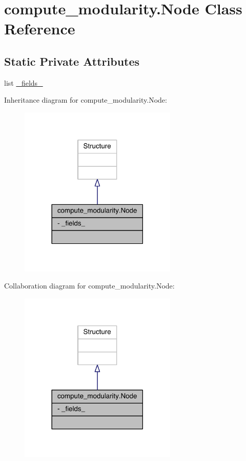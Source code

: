 \hypertarget{classcompute__modularity_1_1_node}{\section{compute\+\_\+modularity.\+Node Class Reference}
\label{classcompute__modularity_1_1_node}
}
\subsection*{Static Private Attributes}
\begin{DoxyCompactItemize}
\item 
list \hyperlink{classcompute__modularity_1_1_node_aab150ff895b8721c991a02712602effb}{\+\_\+fields\+\_\+}
\end{DoxyCompactItemize}


Inheritance diagram for compute\+\_\+modularity.\+Node\+:\nopagebreak
\begin{figure}[H]
\begin{center}
\leavevmode
\includegraphics[width=213pt]{classcompute__modularity_1_1_node__inherit__graph}
\end{center}
\end{figure}


Collaboration diagram for compute\+\_\+modularity.\+Node\+:\nopagebreak
\begin{figure}[H]
\begin{center}
\leavevmode
\includegraphics[width=213pt]{classcompute__modularity_1_1_node__coll__graph}
\end{center}
\end{figure}


